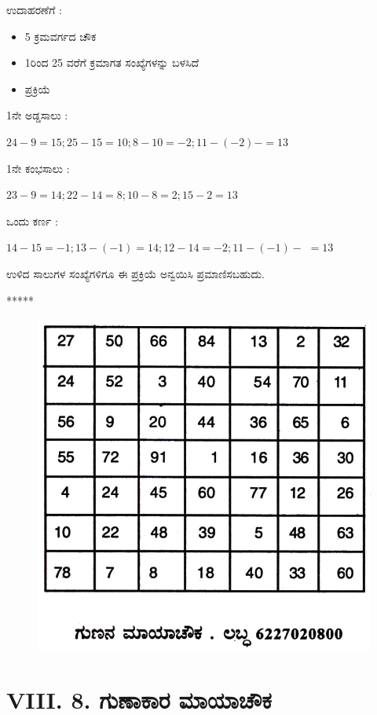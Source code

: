 ಉದಾಹರಣೆಗೆ :
\begin{itemize}
	\item 5 ಕ್ರಮವರ್ಗದ ಚೌಕ
	\item 1ರಿಂದ 25 ವರೆಗೆ ಕ್ರಮಾಗತ ಸಂಖ್ಯೆಗಳನ್ನು ಬಳಸಿದೆ
	\item ಪ್ರಕ್ರಿಯೆ
\end{itemize}

1ನೇ ಅಡ್ಡಸಾಲು :\smallskip

$24-9=15; 25-15=10; 8-10=-2; 11-(-2)-= \boxed{13}$\smallskip

1ನೇ ಕಂಭಸಾಲು :\smallskip

$23-9=14; 22-14=8; 10-8=2; 15-2= \boxed{13}$\smallskip

ಒಂದು ಕರ್ಣ :

$14-15=-1; 13-(-1)=14; 12-14=-2; 11-(-1)-$ $= \boxed{13}$

ಉಳಿದ ಸಾಲುಗಳ ಸಂಖ್ಯೆಗಳಿಗೂ ಈ ಪ್ರಕ್ರಿಯೆ ಅನ್ವಯಿಸಿ ಪ್ರಮಾಣಿಸಬಹುದು.
\begin{center}
*****
\end{center}
\begin{figure}[H]
\includegraphics[scale=1.1]{src/figures/chap7/fig7-25.jpg}
\end{figure}

\section*{VIII. 8. ಗುಣಾಕಾರ ಮಾಯಾಚೌಕ}

